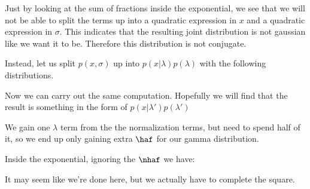 \documentclass[12pt]{article}
\begin{document}

Just by looking at the sum of fractions inside the exponential, we see that we will not be able to split the terms up into a quadratic expression in $x$ and a quadratic expression in $\sigma$. This indicates that the resulting joint distribution is not gaussian like we want it to be. Therefore this distribution is not conjugate.

Instead, let us split $p(x, \sigma)$ up into $p(x|\lambda)p(\lambda)$ with the following distributions.


Now we can carry out the same computation. Hopefully we will find that the result is something in the form of $p(x|\lambda')p(\lambda')$


We gain one $\lambda$ term from the the normalization terms, but need to spend half of it, so we end up only gaining extra $\haf$ for our gamma distribution.


Inside the exponential, ignoring the $\nhaf$ we have:


It may seem like we're done here, but we actually have to complete the square.
\end{document}
